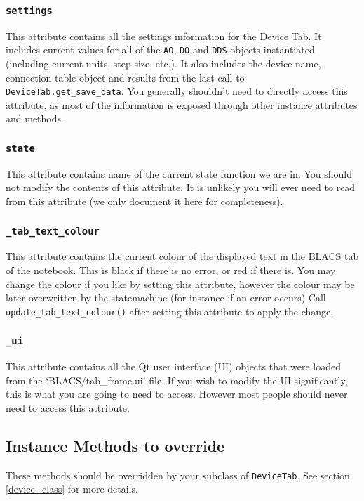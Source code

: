 \documentclass[12pt]{article}
\begin{document}
\subsubsection{\texttt{settings}}\label{ref:settings}
This attribute contains all the settings information for the Device Tab. 
It includes current values for all of the \texttt{AO}, \texttt{DO} and \texttt{DDS} objects instantiated (including current units, step size, etc.). 
It also includes the device name, connection table object and results from the last call to \texttt{DeviceTab.get\_save\_data}.
You generally shouldn't need to directly access this attribute, as most of the information is exposed through other instance attributes and methods.

\subsubsection{\texttt{state}}\label{ref:state}
This attribute contains name of the current state function we are in. 
You should not modify the contents of this attribute.
It is unlikely you will ever need to read from this attribute (we only document it here for completeness).

\subsubsection{\texttt{\_tab\_text\_colour}}\label{ref:_tab_text_colour}
This attribute contains the current colour of the displayed text in the BLACS tab of the notebook. 
This is black if there is no error, or red if there is.
You may change the colour if you like by setting this attribute, however the colour may be later overwritten by the statemachine (for instance if an error occurs)
Call \texttt{update\_tab\_text\_colour()} after setting this attribute to apply the change.

\subsubsection{\texttt{\_ui}}\label{ref:_ui}
This attribute contains all the Qt user interface (UI) objects that were loaded from the `BLACS/tab\_frame.ui' file.
If you wish to modify the UI significantly, this is what you are going to need to access.
However most people should never need to access this attribute.

\subsection{Instance Methods to override}
These methods should be overridden by your subclass of \texttt{DeviceTab}.
See section \ref{device_class} for more details.
\end{document}

